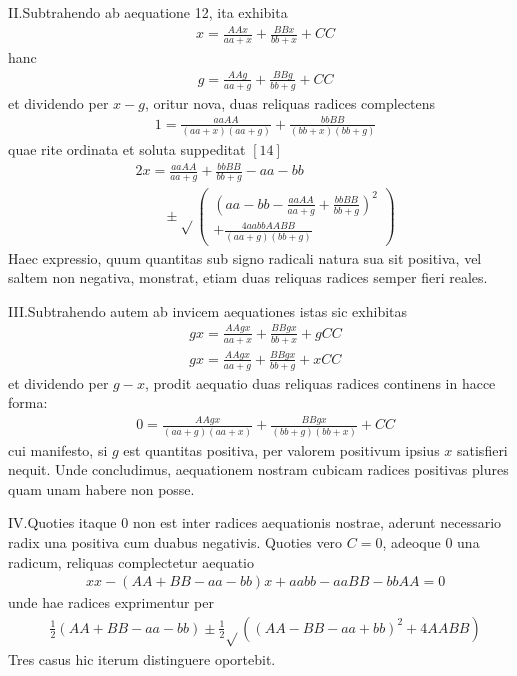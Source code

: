 II.\quad Subtrahendo ab aequatione 12, ita exhibita
\[
\begin{aligned}
&x=\frac{AAx}{aa+x}+\frac{BBx}{bb+x}+CC
\end{aligned}
\]
hanc\textperiodcentered
\[
\begin{aligned}
&g=\frac{AAg}{aa+g}+\frac{BBg}{bb+g}+CC
\end{aligned}
\]
et dividendo per \(x-g\), oritur nova, duas reliquas radices complectens
\[
\begin{aligned}
&1=\frac{aaAA}{(aa+x)(aa+g)}+\frac{bbBB}{(bb+x)(bb+g)}
\end{aligned}
\]
quae rite ordinata et soluta suppeditat \([14]\)
\[
\begin{aligned}
&2x=\frac{aaAA}{aa+g}+\frac{bbBB}{bb+g}-aa-bb\\[6pt]
&\qquad{}\pm\surd\!\left(\begin{gathered}\left(aa-bb-\frac{aaAA}{aa+g}+\frac{bbBB}{bb+g}\right)^2
\\[6pt]+\frac{4aabbAABB}{(aa+g)(bb+g)}\end{gathered}\right)
\end{aligned}
\]
Haec expressio, quum quantitas sub signo radicali natura sua sit positiva, vel
saltem non negativa, monstrat, etiam duas reliquas radices semper fieri reales.

III.\quad Subtrahendo autem ab invicem aequationes istas sic exhibitas
\[
\begin{aligned}
&gx=\frac{AAgx}{aa+x}+\frac{BBgx}{bb+x}+gCC\\[6pt]
&gx=\frac{AAgx}{aa+g}+\frac{BBgx}{bb+g}+xCC
\end{aligned}
\]
et dividendo per \(g-x\), prodit aequatio duas reliquas radices continens in hacce
forma:
\[
\begin{aligned}
&0=\frac{AAgx}{(aa+g)(aa+x)}+\frac{BBgx}{(bb+g)(bb+x)}+CC
\end{aligned}
\]
cui manifesto, si \(g\) est quantitas positiva, per valorem positivum ipsius \(x\) satisfieri nequit. Unde concludimus, aequationem nostram cubicam radices positivas
plures quam unam habere non posse.
\par
IV.\quad Quoties itaque \(0\) non est inter radices aequationis nostrae, aderunt
necessario radix una positiva cum duabus negativis. Quoties vero \(C=0\), adeoque \(0\) una radicum, reliquas complectetur aequatio
\[
\begin{aligned}
&xx-(AA+BB-aa-bb)x+aabb-aaBB-bbAA=0
\end{aligned}
\]
unde hae radices exprimentur per
\[
\begin{aligned}
&\frac12(AA+BB-aa-bb)\pm\frac12\surd\!\left((AA-BB-aa+bb)^2+4AABB\right)
\end{aligned}
\]
Tres casus hic iterum distinguere oportebit.

